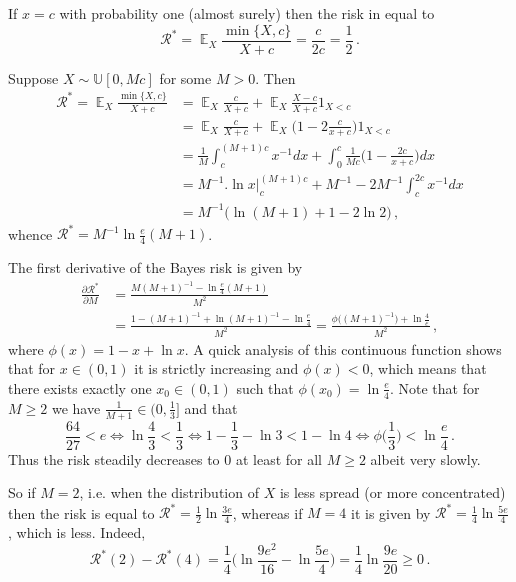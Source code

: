 \documentclass[a4paper,12pt]{extarticle}
\newcommand{\ex}{\mathop{\mathbb{E}}\nolimits}
\begin{document}
If $x=c$ with probability one (almost surely) then the risk in equal to
$$ \mathcal{R}^* = \ex_X \frac{\min\{X, c\}}{X+c} = \frac{c}{2c} = \frac{1}{2}\,.$$

Suppose $X\sim \mathbb{U}[0, Mc]$ for some $M>0$. Then
\begin{align*}
  \mathcal{R}^* = \ex_X \frac{\min\{X, c\}}{X+c}
    &= \ex_X \frac{c}{X+c} + \ex_X \frac{X-c}{X+c} 1_{X < c}\\
    &= \ex_X \frac{c}{X+c} + \ex_X \biggl(1-2\frac{c}{x+c}\biggr) 1_{X < c}\\
    &= \frac{1}{M} \int_c^{(M+1)c} x^{-1} dx
       + \int_0^c \frac{1}{Mc} \biggl(1-\frac{2c}{x+c}\biggr) dx \\
    &= M^{-1} \biggl. \ln x \biggr\rvert_c^{(M+1)c}
       + M^{-1} - 2M^{-1} \int_c^{2c} x^{-1} dx \\
    &= M^{-1} \bigl( \ln (M+1) + 1 - 2 \ln 2 \bigr)
  \,,
\end{align*}
whence $ \mathcal{R}^* = M^{-1} \ln \frac{e}{4}(M+1) $.

The first derivative of the Bayes risk is given by
\begin{align*}
\frac{\partial \mathcal{R}^*}{\partial M}
  &= \frac{ M(M+1)^{-1} - \ln \frac{e}{4}(M+1) }{M^2}\\
  &= \frac{ 1 - (M+1)^{-1} + \ln (M+1)^{-1} - \ln \frac{e}{4} }{M^2}
  = \frac{ \phi\bigl((M+1)^{-1}\bigr) + \ln \frac{4}{e} }{M^2}
  \,,
\end{align*}
where $\phi(x) = 1 - x + \ln x$. A quick analysis of this continuous function shows
that for $x\in(0,1)$ it is strictly increasing and $\phi(x)<0$, which means that there
exists exactly one $x_0\in(0,1)$ such that $\phi(x_0) = \ln\frac{e}{4}$. Note that
for $M\geq 2$ we have $\frac{1}{M+1}\in(0, \frac{1}{3}]$ and that
$$ \frac{64}{27} < e
  \Leftrightarrow \ln \frac{4}{3} < \frac{1}{3} 
  \Leftrightarrow 1 - \frac{1}{3} - \ln 3 < 1 - \ln 4
  \Leftrightarrow \phi\biggl(\frac{1}{3}\biggr) < \ln\frac{e}{4}\,.$$
Thus the risk steadily decreases to $0$ at least for all $M\geq 2$ albeit very slowly.

So if $M=2$, i.e. when the distribution of $X$ is less spread (or more concentrated) then
the risk is equal to $\mathcal{R}^* = \frac{1}{2}\ln \frac{3e}{4}$, whereas if $M=4$ it is
given by $\mathcal{R}^* = \frac{1}{4}\ln \frac{5e}{4}$, which is less. Indeed,
$$ \mathcal{R}^*(2) - \mathcal{R}^*(4)
  = \frac{1}{4}\biggl(\ln \frac{9 e^2}{16} - \ln \frac{5e}{4} \biggr)
  = \frac{1}{4} \ln\frac{9 e}{20} \geq 0\,.$$
\end{document}
